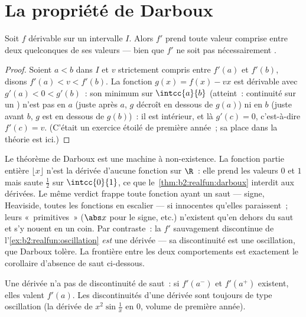 \section{La propriété de Darboux}

\begin{theorem}[Darboux]\label{thm:b2:realfun:darboux}
Soit $f$ dérivable sur un intervalle $I$. Alors $f'$ prend toute
valeur comprise entre deux quelconques de ses valeurs --- bien que
$f'$ ne soit pas nécessairement .
\end{theorem}

\begin{proof}
Soient $a < b$ dans $I$ et $v$ strictement compris entre $f'(a)$ et
$f'(b)$, disons $f'(a) < v < f'(b)$. La fonction $g(x) = f(x) - vx$
est dérivable avec $g'(a) < 0 < g'(b)$~: son minimum sur
$\intcc{a}{b}$ (atteint~: continuité sur un ) n'est pas en $a$
(juste après $a$, $g$ décroît en dessous de $g(a)$) ni en $b$ (juste
avant $b$, $g$ est en dessous de $g(b)$)~: il est intérieur, et là
$g'(c) = 0$, c'est-à-dire $f'(c) = v$. (C'était un exercice étoilé de
première année~; sa place dans la théorie est ici.)
\end{proof}

\begin{example}\label{ex:b2:realfun:whichderivatives}
Le théorème de Darboux est une machine à non-existence. La fonction
partie entière $\lfloor x\rfloor$ n'est la dérivée d'aucune fonction
sur $\R$~: elle prend les valeurs $0$ et $1$ mais saute $\frac12$ sur
$\intcc{0}{1}$, ce que le~\cref{thm:b2:realfun:darboux} interdit aux
dérivées. Le même verdict frappe toute fonction ayant un saut ---
signe, Heaviside, toutes les fonctions en escalier --- si innocentes
qu'elles paraissent~; leurs «~primitives~» ($\abs x$ pour le signe,
etc.) n'existent qu'en dehors du saut et s'y nouent en un coin. Par
contraste~: la $f'$ sauvagement discontinue de
l'\cref{ex:b2:realfun:oscillation} \emph{est} une dérivée --- sa
discontinuité est une oscillation, que Darboux tolère. La frontière
entre les deux comportements est exactement le corollaire d'absence
de saut ci-dessous.
\end{example}

\begin{corollary}\label{cor:b2:realfun:nojumps}
Une dérivée n'a pas de discontinuité de saut~: si $f'(a^-)$ et
$f'(a^+)$ existent, elles valent $f'(a)$. Les discontinuités d'une
dérivée sont toujours de type oscillation (la dérivée de
$x^2\sin\frac1x$ en $0$, volume de première année).
\end{corollary}

